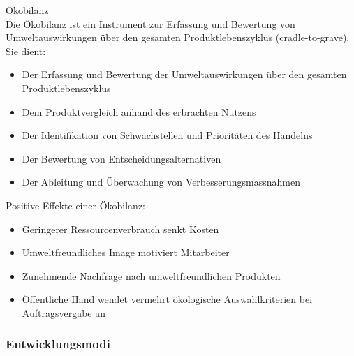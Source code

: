 \begin{definition}{Ökobilanz}\\
Die Ökobilanz ist ein Instrument zur Erfassung und Bewertung von Umweltauswirkungen über den gesamten Produktlebenszyklus (cradle-to-grave). Sie dient:
\begin{itemize}
    \item Der Erfassung und Bewertung der Umweltauswirkungen über den gesamten Produktlebenszyklus
    \item Dem Produktvergleich anhand des erbrachten Nutzens
    \item Der Identifikation von Schwachstellen und Prioritäten des Handelns
    \item Der Bewertung von Entscheidungsalternativen
    \item Der Ableitung und Überwachung von Verbesserungsmassnahmen
\end{itemize}

Positive Effekte einer Ökobilanz:
\begin{itemize}
    \item Geringerer Ressourcenverbrauch senkt Kosten
    \item Umweltfreundliches Image motiviert Mitarbeiter
    \item Zunehmende Nachfrage nach umweltfreundlichen Produkten
    \item Öffentliche Hand wendet vermehrt ökologische Auswahlkriterien bei Auftragsvergabe an
\end{itemize}
\end{definition}


\subsubsection{Entwicklungsmodi}

